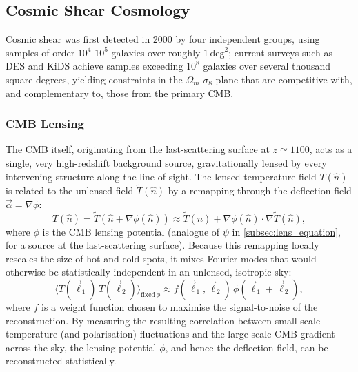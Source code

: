 \subsection{Cosmic Shear Cosmology}

Cosmic shear was first detected in 2000 by four independent groups, using samples of order $10^4$-$10^5$ galaxies over roughly $1\,\text{deg}^2$; current surveys such as DES and KiDS achieve samples exceeding $10^8$ galaxies over several thousand square degrees, yielding constraints in the $\Omega_m$-$\sigma_8$ plane that are competitive with, and complementary to, those from the primary CMB.

\subsubsection{CMB Lensing} \label{subsec:cmb_lensing_probe}

The CMB itself, originating from the last-scattering surface at $z\simeq1100$, acts as a single, very high-redshift background source, gravitationally lensed by every intervening structure along the line of sight. The lensed temperature field $T(\hat n)$ is related to the unlensed field $\tilde T(\hat n)$ by a remapping through the deflection field $\vec\alpha = \nabla\phi$:
\medskip
$$
T(\hat n) = \tilde T(\hat n + \nabla\phi(\hat n)) \approx \tilde T(\hat n) + \nabla\phi(\hat n)\cdot\nabla\tilde T(\hat n) ,
$$
where $\phi$ is the CMB lensing potential (analogue of $\psi$ in \cref{subsec:lens_equation}, for a source at the last-scattering surface). Because this remapping locally rescales the size of hot and cold spots, it mixes Fourier modes that would otherwise be statistically independent in an unlensed, isotropic sky:
\medskip
$$
\langle T(\vec\ell_1)\,T(\vec\ell_2)\rangle_{\text{fixed}\,\phi} \approx f(\vec\ell_1,\vec\ell_2)\,\phi(\vec\ell_1+\vec\ell_2) ,
$$
where $f$ is a weight function chosen to maximise the signal-to-noise of the reconstruction. By measuring the resulting correlation between small-scale temperature (and polarisation) fluctuations and the large-scale CMB gradient across the sky, the lensing potential $\phi$, and hence the deflection field, can be reconstructed statistically.

\medskip


